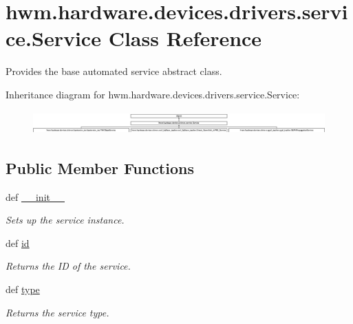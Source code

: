 \hypertarget{classhwm_1_1hardware_1_1devices_1_1drivers_1_1service_1_1_service}{\section{hwm.\-hardware.\-devices.\-drivers.\-service.\-Service Class Reference}
\label{classhwm_1_1hardware_1_1devices_1_1drivers_1_1service_1_1_service}
}


Provides the base automated service abstract class.  


Inheritance diagram for hwm.\-hardware.\-devices.\-drivers.\-service.\-Service\-:\begin{figure}[H]
\begin{center}
\leavevmode
\includegraphics[height=0.909091cm]{classhwm_1_1hardware_1_1devices_1_1drivers_1_1service_1_1_service}
\end{center}
\end{figure}
\subsection*{Public Member Functions}
\begin{DoxyCompactItemize}
\item 
def \hyperlink{classhwm_1_1hardware_1_1devices_1_1drivers_1_1service_1_1_service_aefbe1df6318a06a3a37acccb566d42f3}{\-\_\-\-\_\-init\-\_\-\-\_\-}
\begin{DoxyCompactList}\small\item\em Sets up the service instance. \end{DoxyCompactList}\item 
def \hyperlink{classhwm_1_1hardware_1_1devices_1_1drivers_1_1service_1_1_service_a0ea6b1a043405067d56a80df71f797a9}{id}
\begin{DoxyCompactList}\small\item\em Returns the I\-D of the service. \end{DoxyCompactList}\item 
def \hyperlink{classhwm_1_1hardware_1_1devices_1_1drivers_1_1service_1_1_service_a1948200718e29efe2a6177b2e85f017c}{type}
\begin{DoxyCompactList}\small\item\em Returns the service type. \end{DoxyCompactList}\end{DoxyCompactItemize}
